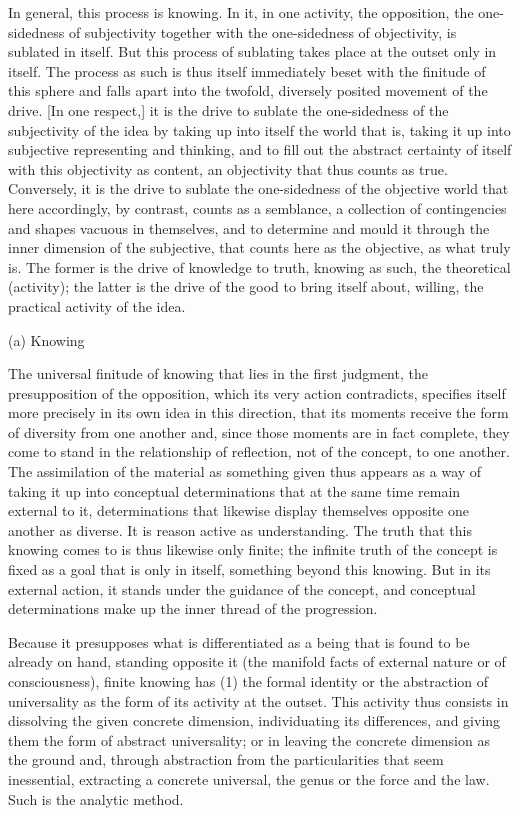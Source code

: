 In general, this process is knowing.
In it, in one activity, the opposition,
the one-sidedness of subjectivity together with
the one-sidedness of objectivity,
is sublated in itself.
But this process of sublating takes place at the outset only in itself.
The process as such is thus itself immediately beset with the finitude
of this sphere and falls apart into the twofold, diversely posited
movement of the drive.
[In one respect,] it is the drive to sublate
the one-sidedness of the subjectivity of the idea
by taking up into itself the world that is,
taking it up into subjective representing and thinking,
and to fill out the abstract certainty of itself
with this objectivity as content, an objectivity that thus counts as true.
Conversely, it is the drive to sublate
the one-sidedness of the objective world
that here accordingly, by contrast, counts as a semblance,
a collection of contingencies and shapes vacuous in themselves,
and to determine and mould it through the inner dimension of the subjective,
that counts here as the objective, as what truly is.
The former is the drive of knowledge to truth, knowing as such,
the theoretical (activity);
the latter is the drive of the good to bring itself about, willing,
the practical activity of the idea.

(a) Knowing

The universal finitude of knowing that lies in the first judgment,
the presupposition of the opposition, which its very action contradicts,
specifies itself more precisely in its own idea in this direction,
that its moments receive the form of diversity from one another and,
since those moments are in fact complete, they come to stand in
the relationship of reflection, not of the concept, to one another.
The assimilation of the material as something given thus appears as
a way of taking it up into conceptual determinations that at the same time
remain external to it, determinations that likewise display themselves
opposite one another as diverse.
It is reason active as understanding.
The truth that this knowing comes to is thus likewise only finite;
the infinite truth of the concept is fixed as a goal that is only in itself,
something beyond this knowing.
But in its external action, it stands under the guidance of the concept,
and conceptual determinations make up the inner thread of the progression.

Because it presupposes what is differentiated as a being that is
found to be already on hand, standing opposite it
(the manifold facts of external nature or of consciousness),
finite knowing has (1) the formal identity or
the abstraction of universality as the form of its activity at the outset.
This activity thus consists in dissolving the given concrete dimension,
individuating its differences, and giving them the form of abstract universality;
or in leaving the concrete dimension as the ground and,
through abstraction from the particularities that seem inessential,
extracting a concrete universal, the genus or the force and the law.
Such is the analytic method.

